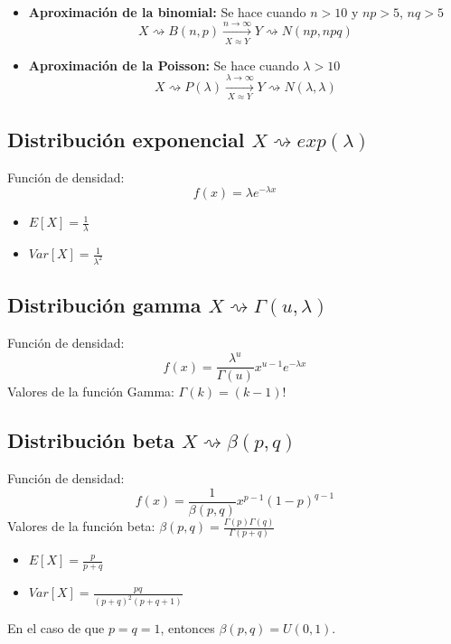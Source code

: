 \documentclass[11pt,twoside,titlepage,a4paper]{article}
\theoremstyle{definition}
\theoremstyle{plain_rojo}
\theoremstyle{remark}
\begin{document}
\begin{itemize}[font={\color{rojooscuro}\bfseries}]
	\item \textbf{Aproximación de la binomial: } Se hace cuando $n>10$ y $np>5$, $nq>5$
	$$X\rightsquigarrow B(n,p)\xrightarrow[X\approx Y]{n\to\infty} Y\rightsquigarrow N(np,npq)$$
	\item \textbf{Aproximación de la Poisson: } Se hace cuando $\lambda>10$
	$$X\rightsquigarrow P(\lambda)\xrightarrow[X\approx Y]{\lambda\to\infty} Y\rightsquigarrow N(\lambda,\lambda)$$
\end{itemize}

\subsection{Distribución exponencial $X\rightsquigarrow exp(\lambda)$}

Función de densidad:
\begin{equation*}
f(x)=\lambda e^{-\lambda x}
\end{equation*}
\begin{multicols}{2}
	\begin{itemize}[label={}]
		\item $E[X]=\displaystyle\frac 1\lambda$
		\item $Var[X]=\displaystyle\frac{1}{\lambda^2}$
	\end{itemize}
\end{multicols}

\subsection{Distribución gamma $X\rightsquigarrow \Gamma(u,\lambda)$}

Función de densidad:
\begin{equation*}
f(x)=\frac{\lambda^u}{\Gamma(u)}x^{u-1}e^{-\lambda x}
\end{equation*}
Valores de la función Gamma: $\Gamma(k)=(k-1)!$

\subsection{Distribución beta $X\rightsquigarrow \beta(p,q)$}

Función de densidad:
\begin{equation*}
f(x)=\frac{1}{\beta(p,q)}x^{p-1}(1-p)^{q-1}
\end{equation*}
Valores de la función beta: $\beta(p,q)=\displaystyle\frac{\Gamma(p)\Gamma(q)}{\Gamma(p+q)}$
\begin{multicols}{2}
	\begin{itemize}[label={}]
		\item $E[X]=\displaystyle\frac{p}{p+q}$
		\item $Var[X]=\displaystyle\frac{pq}{(p+q)^2(p+q+1)}$
	\end{itemize}
\end{multicols}
En el caso de que $p=q=1$, entonces $\beta(p,q)=U(0,1)$.
\end{document}
